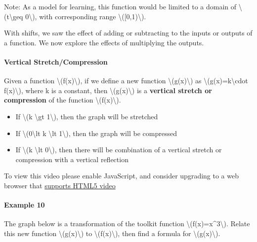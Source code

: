 Note: As a model for learning, this function would be limited to a
domain of \textbackslash{}(t\textbackslash{}geq 0\textbackslash{}), with
corresponding range \textbackslash{}({[}0,1)\textbackslash{}).

With shifts, we saw the effect of adding or subtracting to the inputs or
outputs of a function. We now explore the effects of multiplying the
outputs.

\hypertarget{vertical-stretchcompression}{%
\paragraph{Vertical
Stretch/Compression}\label{vertical-stretchcompression}}

Given a function \textbackslash{}(f(x)\textbackslash{}), if we define a
new function \textbackslash{}(g(x)\textbackslash{}) as
\textbackslash{}(g(x)=k\textbackslash{}cdot f(x)\textbackslash{}), where
k is a constant, then \textbackslash{}(g(x)\textbackslash{}) is a
\textbf{vertical stretch or compression} of the function
\textbackslash{}(f(x)\textbackslash{}).

\begin{itemize}
\tightlist
\item
  If \textbackslash{}(k \textbackslash{}gt 1\textbackslash{}), then the
  graph will be stretched
\item
  If \textbackslash{}(0\textbackslash{}lt k \textbackslash{}lt
  1\textbackslash{}), then the graph will be compressed
\item
  If \textbackslash{}(k \textbackslash{}lt 0\textbackslash{}), then
  there will be combination of a vertical stretch or compression with a
  vertical reflection
\end{itemize}

To view this video please enable JavaScript, and consider upgrading to a
web browser that \href{http://videojs.com/html5-video-support/}{supports
HTML5 video}

\hypertarget{example-10}{%
\paragraph{Example 10}\label{example-10}}

The graph below is a transformation of the toolkit function
\textbackslash{}(f(x)=x\^{}3\textbackslash{}). Relate this new function
\textbackslash{}(g(x)\textbackslash{}) to
\textbackslash{}(f(x)\textbackslash{}), then find a formula for
\textbackslash{}(g(x)\textbackslash{}).

